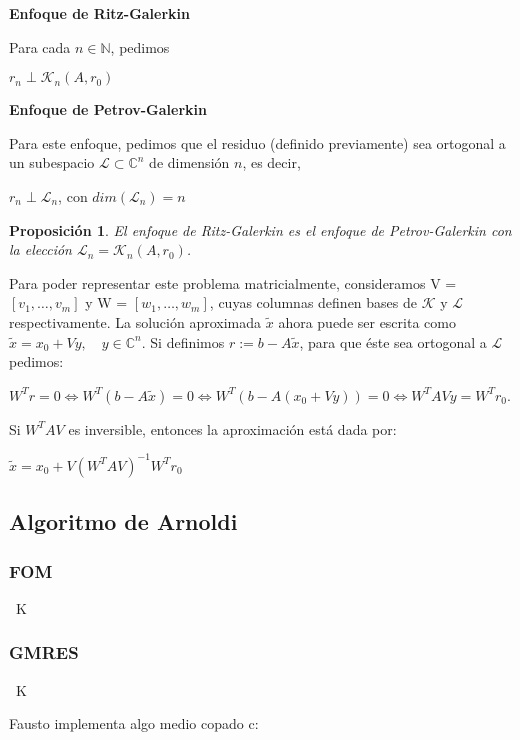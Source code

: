 \documentclass[12pt, oneside]{book}
\begin{document}
\begin{flushleft}
	\textbf{Enfoque de Ritz-Galerkin}
\end{flushleft}
Para cada $n \in \mathbb{N}$, pedimos
\begin{center}
	$r_n \perp \mathcal{K}_{n}(A, r_0)$
\end{center}
\begin{flushleft}
	\textbf{Enfoque de Petrov-Galerkin}
\end{flushleft}
Para este enfoque, pedimos que el residuo (definido previamente) sea ortogonal a un subespacio $\mathcal{L} \subset \mathbb{C}^{n}$ de dimensión $n$, es decir,
\begin{center}
	$r_n \perp \mathcal{L}_n$, con $dim(\mathcal{L}_n) = n$
\end{center}
\newtheorem{proposicion}{Proposición}
\begin{proposicion}
	El enfoque de Ritz-Galerkin es el enfoque de Petrov-Galerkin con la elección $\mathcal{L}_n = \mathcal{K}_{n}(A, r_0)$.
\end{proposicion}
Para poder representar este problema matricialmente, consideramos V = $[v_1, \ldots, v_m]$ y W = $[w_1, \ldots, w_m]$, cuyas columnas definen bases de $\mathcal{K}$ y $\mathcal{L}$ respectivamente. La solución aproximada $\tilde{x}$ ahora puede ser escrita como $\tilde{x} = x_0 + Vy, \quad y \in \mathbb{C}^n$. Si definimos $r := b - A\tilde{x}$, para que éste sea ortogonal a $\mathcal{L}$ pedimos:
\begin{center}
	$W^Tr = 0 \iff W^T(b - A\tilde{x}) = 0 \iff W^T(b - A(x_0 + Vy)) = 0 \iff \boxed{W^TAVy = W^Tr_0}$.
\end{center}
Si $W^TAV$ es inversible, entonces la aproximación está dada por:
\begin{center}
	$\tilde{x} = x_0 + V(W^TAV)^{-1}W^Tr_0$
\end{center}
	\subsection{Algoritmo de Arnoldi}
	\subsubsection{FOM}
	\ K
	\subsubsection{GMRES}
	\ K
	
	
	Fausto implementa algo medio copado c:
	
\end{document}
